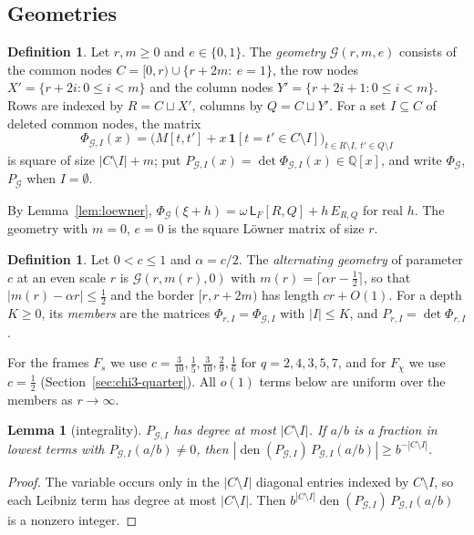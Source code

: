 \documentclass[11pt]{amsart}
\newtheorem{lemma}[theorem]{Lemma}
\theoremstyle{definition}
\newtheorem{definition}[theorem]{Definition}
\theoremstyle{remark}
\numberwithin{equation}{section}
\newcommand{\Q}{\mathbb Q}
\newcommand{\den}{\operatorname{den}}
\newcommand{\Lw}{\mathsf L}          %
\begin{document}
\subsection{Geometries}
\begin{definition}\label{def:geometry}
Let $r,m\ge0$ and $e\in\{0,1\}$. The \emph{geometry} $\mathcal G(r,m,e)$ consists of the common nodes
$C=[0,r)\cup\{r+2m:\ e=1\}$, the row nodes $X'=\{r+2i:0\le i<m\}$ and the column nodes
$Y'=\{r+2i+1:0\le i<m\}$. Rows are indexed by $R=C\sqcup X'$, columns by $Q=C\sqcup Y'$. For a set $I\subseteq C$ of
deleted common nodes, the matrix
\[
 \Phi_{\mathcal G,I}(x)=\bigl(M[t,t']+x\,\mathbf 1[t=t'\in C\setminus I]\bigr)_{t\in R\setminus I,\ t'\in Q\setminus I}
\]
is square of size $|C\setminus I|+m$; put $P_{\mathcal G,I}(x)=\det\Phi_{\mathcal G,I}(x)\in\Q[x]$, and write
$\Phi_{\mathcal G}$, $P_{\mathcal G}$ when $I=\emptyset$.
\end{definition}

By Lemma~\ref{lem:loewner}, $\Phi_{\mathcal G}(\xi+h)=\omega\,\Lw_F[R,Q]+h\,E_{R,Q}$ for real $h$. The geometry
with $m=0$, $e=0$ is the square L\"owner matrix of size $r$.

\begin{definition}\label{def:altgeom}
Let $0<c\le1$ and $\alpha=c/2$. The \emph{alternating geometry} of parameter $c$ at an even scale $r$ is
$\mathcal G(r,m(r),0)$ with $m(r)=\lceil\alpha r-\frac12\rceil$, so that $|m(r)-\alpha r|\le\frac12$ and the border
$[r,r+2m)$ has length $cr+O(1)$. For a depth $K\ge0$, its \emph{members} are the matrices $\Phi_{r,I}=\Phi_{\mathcal G,I}$
with $|I|\le K$, and $P_{r,I}=\det\Phi_{r,I}$.
\end{definition}

For the frames $F_s$ we use $c=\frac3{10},\frac15,\frac3{10},\frac29,\frac16$ for $q=2,4,3,5,7$, and for $F_\chi$ we use $c=\frac12$
(Section~\ref{sec:chi3-quarter}). All $o(1)$ terms below are uniform over the members as $r\to\infty$.

\begin{lemma}[integrality]\label{lem:integrality}
$P_{\mathcal G,I}$ has degree at most $|C\setminus I|$. If $a/b$ is a fraction
in lowest terms with $P_{\mathcal G,I}(a/b)\ne0$, then $|\den(P_{\mathcal G,I})\,P_{\mathcal G,I}(a/b)|\ge b^{-|C\setminus I|}$.
\end{lemma}
\begin{proof}
The variable occurs only in the $|C\setminus I|$ diagonal entries indexed by $C\setminus I$, so each Leibniz term has
degree at most $|C\setminus I|$. Then $b^{|C\setminus I|}\den(P_{\mathcal G,I})\,P_{\mathcal G,I}(a/b)$ is a nonzero integer.
\end{proof}
\end{document}
